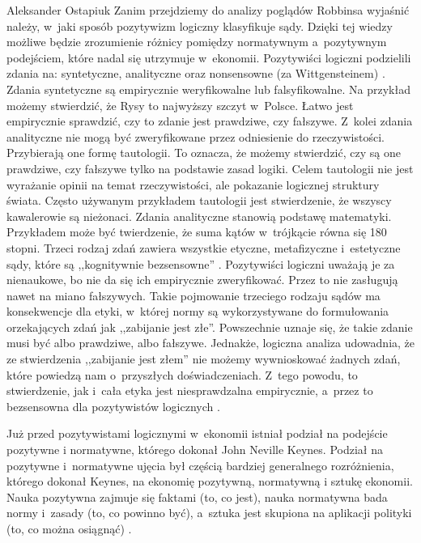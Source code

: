 \begin{artplenv}{Aleksander Ostapiuk}
Zanim przejdziemy do analizy poglądów Robbinsa wyjaśnić należy, w~jaki sposób pozytywizm logiczny klasyfikuje sądy.
Dzięki tej wiedzy możliwe będzie zrozumienie różnicy pomiędzy normatywnym a~pozytywnym podejściem, które nadal się
utrzymuje w~ekonomii. Pozytywiści logiczni podzielili zdania na: syntetyczne, analityczne oraz nonsensowne (za Wittgensteinem)
\parencite[s.~10 i~18]{putnam_collapse_2002}.
Zdania syntetyczne są empirycznie
weryfikowalne lub falsyfikowalne. Na przykład możemy stwierdzić, że Rysy to najwyższy szczyt w~Polsce. Łatwo jest
empirycznie sprawdzić, czy to zdanie jest prawdziwe, czy fałszywe. Z~kolei zdania analityczne nie mogą być zweryfikowane
przez odniesienie do rzeczywistości. Przybierają one formę tautologii. To oznacza, że możemy stwierdzić, czy są one
prawdziwe, czy fałszywe tylko na podstawie zasad logiki. Celem tautologii nie jest wyrażanie opinii na temat
rzeczywistości, ale pokazanie logicznej struktury świata. Często używanym przykładem tautologii jest stwierdzenie, że
wszyscy kawalerowie są nieżonaci. Zdania analityczne stanowią podstawę matematyki. Przykładem może być twierdzenie, że
suma kątów w~trójkącie równa się 180 stopni. Trzeci rodzaj zdań zawiera wszystkie etyczne, metafizyczne i~estetyczne
sądy, które są ,,kognitywnie bezsensowne''
\parencite[s.~10]{putnam_collapse_2002}.
Pozytywiści logiczni uważają
je za nienaukowe, bo nie da się ich empirycznie zweryfikować. Przez to nie zasługują nawet na miano fałszywych. Takie
pojmowanie trzeciego rodzaju sądów ma konsekwencje dla etyki, w~której normy są wykorzystywane do formułowania
orzekających zdań jak ,,zabijanie jest złe''. Powszechnie uznaje się, że takie zdanie musi być albo prawdziwe, albo
fałszywe. Jednakże, logiczna analiza udowadnia, że ze stwierdzenia ,,zabijanie jest złem'' nie możemy wywnioskować żadnych
zdań, które powiedzą nam o~przyszłych doświadczeniach. Z~tego powodu, to stwierdzenie, jak i~cała etyka jest
niesprawdzalna empirycznie, a~przez to bezsensowna dla pozytywistów logicznych
\parencite[s.~25]{carnap_philosophy_1935}.

Już przed pozytywistami logicznymi w~ekonomii istniał podział na podejście pozytywne i normatywne, którego dokonał John
Neville Keynes. Podział na pozytywne i~normatywne ujęcia był częścią bardziej generalnego rozróżnienia,
którego dokonał Keynes, na ekonomię pozytywną, normatywną i sztukę ekonomii.
Nauka pozytywna zajmuje się faktami (to, co jest), nauka normatywna bada
normy i~zasady (to, co powinno być), a~sztuka jest skupiona na aplikacji polityki (to, co można osiągnąć)
\parencite[s.~34–35]{keynes_scope_1917}.


\end{artplenv}
